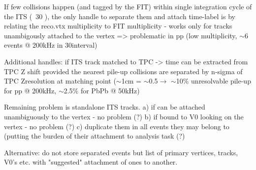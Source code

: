 If few collisions happen (and tagged by the FIT) within single
integration cycle of the ITS (~30 \ums), the only handle
to separate them and attach time-label is by relating the reco.vtx
multiplicity to FIT multiplicity - works only for tracks unambigously
attached to the vertex => problematic in pp (low multiplicity, $\sim$6 
events @ 200kHz in 30\ums interval)

Additional handles: if ITS track matched to TPC -> time can be
extracted from TPC Z shift provided the nearest pile-up collisions are
separated by n-sigma of TPC Zresolution at matching point 
($\sim$1cm = $\sim$0.5\ums $\rightarrow$ $\sim$10\% unresolvable pile-up
for pp @ 200kHz, $\sim$2.5\% for PbPb @ 50kHz)

Remaining problem is standalone ITS tracks.
a) if can be attached unambiguously to the vertex - no problem (?)
b) if bound to V0 looking on the vertex - no problem (?)
c) duplicate them in all events they may belong to (putting the burden
of their attachment to analysis task (?)

Alternative: do not store separated events but list of primary
vertices, tracks, V0's etc. with "suggested" attachment of ones to another.

